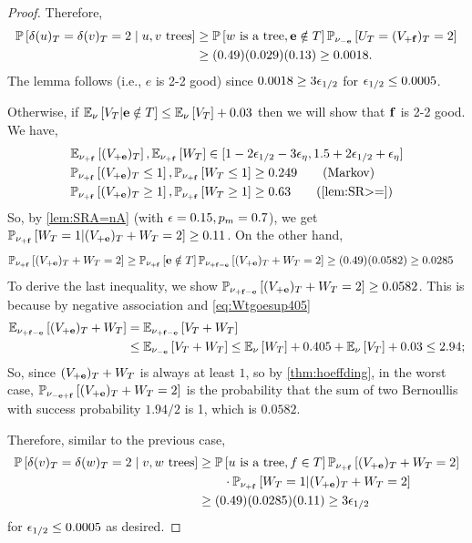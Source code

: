 \begin{proof}
Therefore,
\begin{align*} {\mathbb{P}}\left[\delta(u)_T=\delta(v)_T=2 \mid u,v \text{ trees}\right] &\geq {\mathbb{P}}\left[w\text{ is a tree},{\bf e}\notin T\right]{\mathbb{P}}_{\nu_{-{\bf e}}}\left[U_T=(V_{+{\bf f}})_T=2\right] \\
& \geq (0.49)(0.029)(0.13)\geq 0.0018.
\end{align*}
The lemma follows (i.e., $e$ is 2-2 good) since $0.0018\geq 3{\epsilon}_{1/2}$ for ${\epsilon}_{1/2}\leq 0.0005$.

% 
Otherwise, if ${\mathbb{E}}_{\nu}\left[V_T | {\bf e}\notin T\right]\leq {\mathbb{E}}_{\nu}\left[V_T\right]+0.03$ then we will show that ${\bf f}$ is 2-2 good. We have,
\begin{align*}
	& \EE{\nu_{+\bbf}}{(V_{+\bbe})_T},\EE{\nu_{+\bbf}}{W_T} \in  [1-2 \eps_{1/2}-3\eps_\eta,1.5+2\eps_{1/2}+\eps_\eta]\\
&\PP{\nu_{+\bbf}}{(V_{+\bbe})_T\leq 1},\PP{\nu_{+\bbf}}{W_T\leq 1}\geq 0.249 \tag{Markov} \\
&\PP{\nu_{+\bbf}}{(V_{+\bbe})_T\geq 1},\PP{\nu_{+\bbf}}{W_T\geq 1}\geq 0.63 \tag{\cref{lem:SR>=}}
\end{align*}
So, by \cref{lem:SRA=nA} (with ${\epsilon}=0.15,p_m=0.7$), we get ${\mathbb{P}}_{\nu_{+{\bf f}}}\left[W_T=1 | (V_{+{\bf e}})_T+W_T=2\right]\geq 0.11$. 
On the other hand, 
\begin{align*}
	&{\mathbb{P}}_{\nu_{+{\bf f}}}\left[(V_{+{\bf e}})_T+W_T=2\right] \geq {\mathbb{P}}_{\nu_{+{\bf f}}}\left[{\bf e}\notin T\right]{\mathbb{P}}_{\nu_{+{\bf f}-{\bf e}}}\left[(V_{+{\bf e}})_T+W_T=2\right] \geq (0.49)(0.0582)\geq 0.0285
\end{align*}
To derive the last inequality, we show  ${\mathbb{P}}_{\nu_{+{\bf f}-{\bf e}}}\left[(V_{+{\bf e}})_T+W_T=2\right]\geq 0.0582$. This is because by negative association and \cref{eq:Wtgoesup405} %
\begin{align*} {\mathbb{E}}_{\nu_{+{\bf f}-{\bf e}}}\left[(V_{+{\bf e}})_T+W_T\right] &= {\mathbb{E}}_{\nu_{+{\bf f}-{\bf e}}}\left[V_T+W_T\right]\\
&	
\leq {\mathbb{E}}_{\nu_{-{\bf e}}}\left[V_T+W_T\right] \leq  {\mathbb{E}}_{\nu}\left[W_T\right]+0.405 + {\mathbb{E}}_{\nu}\left[V_T\right] + 0.03 \leq 2.94;
\end{align*}
So, since $(V_{+{\bf e}})_T+W_T$ is always at least $1$,   so by \cref{thm:hoeffding}, in the worst case, ${\mathbb{P}}_{\nu_{-{\bf e}+{\bf f}}}\left[(V_{+{\bf e}})_T+W_T=2\right]$ is the probability that the sum of two Bernoullis with success probability $1.94/2$ is 1, which is $0.0582$. 

Therefore, similar to the previous case, 
\begin{align*}{\mathbb{P}}\left[\delta(v)_T=\delta(w)_T=2 \mid v,w \text{ trees}\right]&\geq {\mathbb{P}}\left[u\text{ is a tree},f\in T\right]{\mathbb{P}}_{\nu_{+{\bf f}}}\left[(V_{+{\bf e}})_T+W_T=2\right] \\& \quad\quad \cdot {\mathbb{P}}_{\nu_{+{\bf f}}}\left[W_T=1 | (V_{+{\bf e}})_T+W_T=2\right]\\
&\geq (0.49) (0.0285)(0.11) \geq 3{\epsilon}_{1/2}
\end{align*}
for ${\epsilon}_{1/2}\leq 0.0005$ as desired.
\end{proof}


